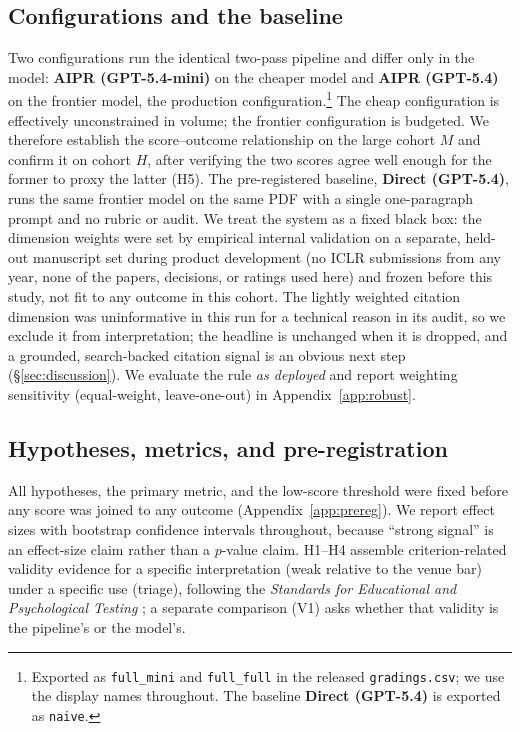 \subsection{Configurations and the baseline}
Two configurations run the identical two-pass pipeline and differ only in the model:
\textbf{AIPR (GPT-5.4-mini)} on the cheaper model and \textbf{AIPR (GPT-5.4)} on the
frontier model, the production configuration.\footnote{Exported as \texttt{full\_mini}
and \texttt{full\_full} in the released \texttt{gradings.csv}; we use the display names
throughout. The baseline \textbf{Direct (GPT-5.4)} is exported as \texttt{naive}.} The
cheap configuration is effectively unconstrained in volume; the frontier configuration is
budgeted. We therefore establish the score--outcome relationship on the large cohort $M$
and confirm it on cohort $H$, after verifying the two scores agree well enough for the
former to proxy the latter (H5). The pre-registered baseline, \textbf{Direct (GPT-5.4)},
runs the same frontier model on the same PDF with a single one-paragraph prompt and no
rubric or audit. We treat the system as a fixed black box: the dimension weights were set
by empirical internal validation on a separate, held-out manuscript set during product
development (no ICLR submissions from any year, none of the papers, decisions, or ratings
used here) and frozen before this study, not fit to any outcome in this cohort. The
lightly weighted citation dimension was uninformative in this run for a technical reason
in its audit, so we exclude it from interpretation; the headline is unchanged when it is
dropped, and a grounded, search-backed citation signal is an obvious next step
(\S\ref{sec:discussion}). We evaluate the rule \emph{as deployed} and report weighting
sensitivity (equal-weight, leave-one-out) in Appendix~\ref{app:robust}.

\subsection{Hypotheses, metrics, and pre-registration}
All hypotheses, the primary metric, and the low-score threshold were fixed before any
score was joined to any outcome (Appendix~\ref{app:prereg}). We report effect sizes with
bootstrap confidence intervals throughout, because ``strong signal'' is an effect-size
claim rather than a $p$-value claim. H1--H4 assemble criterion-related validity evidence
for a specific interpretation (weak relative to the venue bar) under a specific use
(triage), following the \emph{Standards for Educational and Psychological Testing}
\citep{aera2014standards}; a separate comparison (V1) asks whether that validity is the
pipeline's or the model's.

